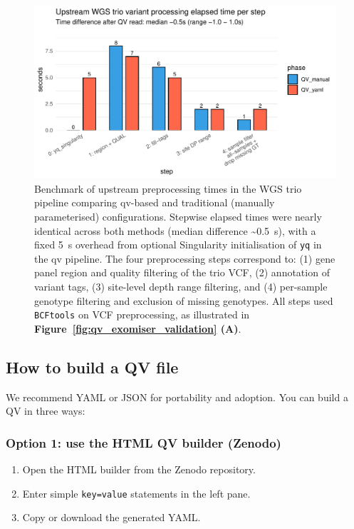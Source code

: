 \begin{figure}[h]
\centering
\includegraphics[width=\textwidth]{./images/qv_exomiser/benchmark_preprocess_time_bars_by_step_elapsed.pdf}
\caption{Benchmark of upstream preprocessing times in the WGS trio pipeline comparing \ac{qv}-based and traditional (manually parameterised) configurations. Stepwise elapsed times were nearly identical across both methods (median difference \textasciitilde0.5~s), with a fixed 5~s overhead from optional Singularity initialisation of \texttt{yq} in the \ac{qv} pipeline. The four preprocessing steps correspond to: (1) gene panel region and quality filtering of the trio VCF, (2) annotation of variant tags, (3) site-level depth range filtering, and (4) per-sample genotype filtering and exclusion of missing genotypes. All steps used \texttt{BCFtools} on VCF preprocessing, as illustrated in \textbf{Figure~\ref{fig:qv_exomiser_validation} (A)}.}
\label{fig:benchmark_preprocess_time_bars_by_step_elapsed}
\end{figure}



\subsection{How to build a QV file}

We recommend YAML or JSON for portability and adoption. You can build a QV in three ways:

\subsubsection*{Option 1: use the HTML QV builder (Zenodo)}
\begin{enumerate}
\item Open the HTML builder from the Zenodo repository.
\item Enter simple \texttt{key=value} statements in the left pane.
\item Copy or download the generated YAML.
\end{enumerate}

